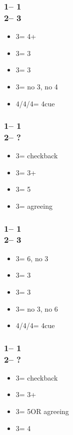 \documentclass[12pt, a4paper]{article}
\begin{document}
\subsubsection*{1\clubs -- 1\hearts \\ 2\nt -- 3\clubs}
\begin{itemize}
    \item 3\diams = 4+\clubs
    \item 3\hearts = 3\hearts
    \item 3\spades = 3\clubs
    \item 3\nt = no 3\hearts, no 4\clubs
    \item 4\clubs/4\diams/4\hearts = 4\hearts cue
\end{itemize}

\subsubsection*{1\diams -- 1\spades \\ 2\nt -- ?}
\begin{itemize}
    \item 3\clubs = checkback
    \item 3\diams = 3+\diams
    \item 3\hearts = 5\hearts
    \item 3\spades = agreeing \spades
\end{itemize}

\subsubsection*{1\diams -- 1\spades \\ 2\nt -- 3\clubs}
\begin{itemize}
    \item 3\diams = 6\diams, no 3\spades
    \item 3\hearts = 3\diams
    \item 3\spades = 3\spades
    \item 3\nt = no 3\spades, no 6\diams
    \item 4\clubs/4\diams/4\hearts = 4\spades cue
\end{itemize}

\subsubsection*{1\diams -- 1\hearts \\ 2\nt -- ?}
\begin{itemize}
    \item 3\clubs = checkback
    \item 3\diams = 3+\diams
    \item 3\hearts = 5\spades OR agreeing \hearts
    \item 3\spades = 4\spades
\end{itemize}
\end{document}
